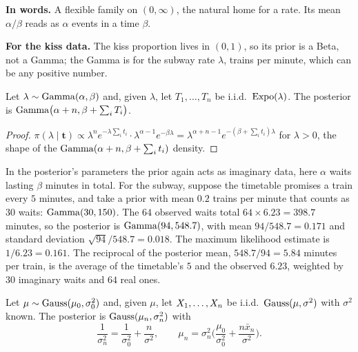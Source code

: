 \begin{inwords}
\textbf{In words.} A flexible family on $(0, \infty)$, the natural home for a rate. Its mean $\alpha/\beta$ reads as $\alpha$ events in a time $\beta$.
\par\smallskip
\textbf{For the kiss data.} The kiss proportion lives in $(0, 1)$, so its prior is a Beta, not a Gamma; the Gamma is for the subway rate $\lambda$, trains per minute, which can be any positive number.
\end{inwords}

\begin{proposition}
\label{prop:gamma-expo}
Let $\lambda \sim \mathrm{Gamma}(\alpha, \beta)$ and, given $\lambda$, let $T_1, \ldots, T_n$ be i.i.d.\ $\text{Expo}(\lambda)$. The posterior is $\mathrm{Gamma}\big(\alpha + n, \beta + \sum_i T_i\big)$.
\end{proposition}

\begin{proof}
$\pi(\lambda \mid \mathbf{t}) \propto \lambda^n e^{-\lambda\sum_i t_i} \cdot \lambda^{\alpha - 1}e^{-\beta\lambda} = \lambda^{\alpha + n - 1}e^{-(\beta + \sum_i t_i)\lambda}$ for $\lambda > 0$, the shape of the $\mathrm{Gamma}(\alpha + n, \beta + \sum_i t_i)$ density.
\end{proof}

In the posterior's parameters the prior again acts as imaginary data, here $\alpha$ waits lasting $\beta$ minutes in total.
For the subway, suppose the timetable promises a train every $5$ minutes, and take a prior with mean $0.2$ trains per minute that counts as $30$ waits: $\mathrm{Gamma}(30, 150)$.
The $64$ observed waits total $64 \times 6.23 = 398.7$ minutes, so the posterior is $\mathrm{Gamma}(94, 548.7)$, with mean $94/548.7 = 0.171$ and standard deviation $\sqrt{94}/548.7 = 0.018$.
The maximum likelihood estimate is $1/6.23 = 0.161$. The reciprocal of the posterior mean, $548.7/94 = 5.84$ minutes per train, is the average of the timetable's $5$ and the observed $6.23$, weighted by $30$ imaginary waits and $64$ real ones.

\begin{proposition}
\label{prop:normal-normal}
Let $\mu \sim \text{Gauss}(\mu_0, \sigma_0^2)$ and, given $\mu$, let $X_1, \ldots, X_n$ be i.i.d.\ $\text{Gauss}(\mu, \sigma^2)$ with $\sigma^2$ known. The posterior is $\text{Gauss}(\mu_n, \sigma_n^2)$ with
\[
\frac{1}{\sigma_n^2} = \frac{1}{\sigma_0^2} + \frac{n}{\sigma^2}, \qquad \mu_n = \sigma_n^2\Big(\frac{\mu_0}{\sigma_0^2} + \frac{n\bar{x}_n}{\sigma^2}\Big).
\]
\end{proposition}

